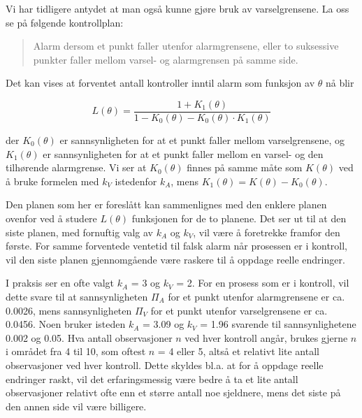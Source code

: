 \noindent Vi har tidligere antydet at man også kunne gjøre bruk av 
varselgrensene.  La oss se på følgende kontrollplan:

\begin{quote}
    Alarm dersom et punkt faller utenfor alarmgrensene, eller to 
    suksessive punkter faller mellom varsel- og alarmgrensen på
    samme side.    
\end{quote}

\noindent Det kan vises at forventet antall kontroller inntil alarm som
 funksjon av $\theta$ nå blir

\[  L(\theta )=\frac{1+K_1(\theta )}{1-K_0(\theta )-K_0(\theta )\cdot K_1(\theta )}  \]

\noindent der $K_0(\theta )$ er sannsynligheten for at et punkt faller mellom 
varselgrensene, og $K_1(\theta )$ er sannsynligheten for at et punkt faller 
mellom en varsel- og den tilhørende alarmgrense.  Vi ser at $K_0(\theta)$
finnes på samme måte som $K(\theta)$ ved å bruke formelen med
$k_V$ istedenfor $k_A$, mens $K_1(\theta) = K(\theta) - K_0(\theta)$.

Den planen som her er foreslått kan sammenlignes med den enklere
planen ovenfor ved å studere $L(\theta)$ funksjonen for de to
planene.  Det ser ut til at den siste planen, med fornuftig valg av
$k_A$ og $k_V$, vil være å foretrekke framfor den første.  
For samme forventede ventetid til falsk alarm når prosessen er i 
kontroll, vil den siste planen gjennomgående være raskere til 
å oppdage reelle endringer.

I praksis ser en ofte valgt $k_A$ = 3 og $k_V$ = 2.  For en prosess som
er i kontroll, vil dette svare til at sannsynligheten ${\Pi}_A$ for et
punkt utenfor alarm\-grensene er ca. 0.0026, mens sannsynligheten
${\Pi}_V$ for et punkt utenfor varselgrensene er ca. 0.0456.  Noen
bruker isteden $k_A$ = 3.09 og $k_V$ = 1.96 svarende til 
sannsynlighetene 0.002 og 0.05.  Hva antall observasjoner $n$ ved hver
kontroll angår, brukes gjerne $n$ i området fra 4 til 10, som
oftest $n$ = 4 eller 5, altså et relativt lite antall observasjoner
ved hver kontroll.  Dette skyldes bl.a. at for å oppdage reelle 
endringer raskt, vil det erfaringsmessig være bedre å ta et lite
antall observasjoner relativt ofte enn et større antall noe sjeldnere,
mens det siste på den annen side vil være billigere.\\


